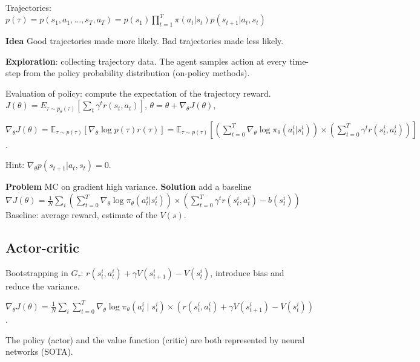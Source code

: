Trajectories: \(p(\tau) = p(s_{1}, a_{1}, \ldots, s_{T}, a_{T})= p(s_{1}) \prod_{t=1}^{T} \pi(a_{t} | s_{t}) p(s_{t+1} | a_{t}, s_{t})\)

\textbf{Idea} Good trajectories made more likely. Bad trajectories made less likely.

\textbf{Exploration}: collecting trajectory data. The agent samples action at every time-step from the policy probability distribution (on-policy methods). 

Evaluation of policy: compute the expectation of the trajectory reward. \
%
\(J(\theta)=E_{\tau \sim p_{\theta}(\tau)}[\sum_{t} \gamma^{t} r(s_{t}, a_{t})]\), \(\theta=\theta+\nabla_{\theta} J(\theta)\),
% 

\(\nabla_{\theta} J(\theta) = \mathbb{E}_{\tau \sim p(\tau)}[\nabla_{\theta} \log p(\tau) r(\tau)] = \mathbb{E}_{\tau \sim p(\tau)}[(\sum_{t=0}^{T} \nabla_{\theta} \log \pi_{\theta}(a_{t}^{i} | s_{t}^{i})) \times (\sum_{t=0}^{T} \gamma^{t} r(s_{t}^{i}, a_{t}^{i}))]\).

Hint: \(\nabla_\theta p(s_{t+1}|a_t, s_t) = 0\).

\textbf{Problem} MC on gradient high variance. \textbf{Solution} add a baseline \(\nabla J(\theta)=\frac{1}{N} \sum_{i}(\sum_{t=0}^{T} \nabla_{\theta} \log \pi_{\theta}(a_{t}^{i} | s_{t}^{i})) \times (\sum_{t=0}^{T} \gamma^{t} r(s_{t}^{i}, a_{t}^{i})-b(s_{t}^{i}))\) Baseline: average reward, estimate of the \(V(s)\).

\subsection*{Actor-critic}
Bootstrapping in \(G_{\tau}\): \(r(s_{t}^{i}, a_{t}^{i})+\gamma V(s_{t+1}^{i})-V(s_{t}^{i})\), introduce bias and reduce the variance.

\(\nabla_{\theta} J(\theta)=\frac{1}{N} \sum_{i} \sum_{t=0}^{T} \nabla_{\theta} \log \pi_{\theta}(a_{t}^{i} \mid s_{t}^{i}) \times (r(s_{t}^{i}, a_{t}^{i})+\gamma V(s_{t+1}^{i})-V(s_{t}^{i}))\).

The policy (actor) and the value function (critic) are both represented by neural networks (SOTA).
